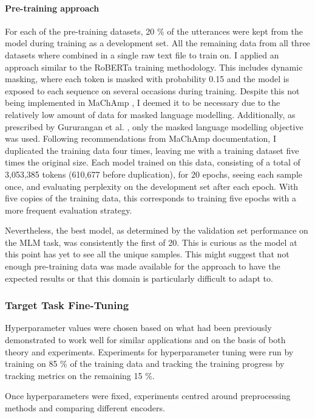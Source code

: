\documentclass[12pt]{report}
\begin{document}
\paragraph*{Pre-training approach}
For each of the pre-training datasets, 20 \% of the utterances were kept from the model during training as a development set.
All the remaining data from all three datasets where combined in a single raw text file to train on.
I applied an approach similar to the RoBERTa training methodology.
This includes dynamic masking, where each token is masked with probability 0.15 and the model is exposed to each sequence on several occasions during training.
Despite this not being implemented in MaChAmp \cite{MaChAmp}, I deemed it to be necessary due to the relatively low amount of data for masked language modelling.
Additionally, as prescribed by Gururangan et al. \citeyear{Gururangan2020}, only the masked language modelling objective was used.
Following recommendations from MaChAmp documentation, I duplicated the training data four times, leaving me with a training dataset five times the original size.
Each model trained on this data, consisting of a total of 3,053,385 tokens (610,677 before duplication), for 20 epochs, seeing each sample once, and evaluating perplexity on the development set after each epoch.
With five copies of the training data, this corresponds to training five epochs with a more frequent evaluation strategy.

Nevertheless, the best model, as determined by the validation set performance on the MLM task, was consistently the first of 20.
This is curious as the model at this point has yet to see all the unique samples.
This might suggest that not enough pre-training data was made available for the approach to have the expected results or that this domain is particularly difficult to adapt to.

\subsubsection{Target Task Fine-Tuning}
Hyperparameter values were chosen based on what had been previously demonstrated to work well for similar applications and on the basis of both theory and experiments.
Experiments for hyperparameter tuning were run by training on 85 \% of the training data and tracking the training progress by tracking metrics on the remaining 15 \%.

Once hyperparameters were fixed, experiments centred around preprocessing methods and comparing different encoders.
\end{document}
